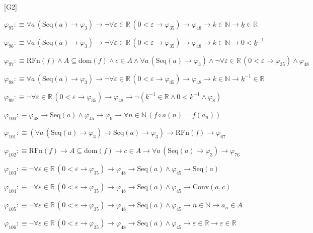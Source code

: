 \begin{fullproof}{[G2]}
\begin{abbrevlist}
\item $\varphi_{95} :\equiv \forall a\,(\mathrm{Seq}(a) \to \varphi_{3}) \to \neg \forall \varepsilon \in \mathbb{R}\,(0 < \varepsilon \to \varphi_{35}) \to \varphi_{48} \to k \in \mathbb{N} \to \underline{k} \in \mathbb{R}$
\item $\varphi_{96} :\equiv \forall a\,(\mathrm{Seq}(a) \to \varphi_{3}) \to \neg \forall \varepsilon \in \mathbb{R}\,(0 < \varepsilon \to \varphi_{35}) \to \varphi_{48} \to k \in \mathbb{N} \to 0 < \underline{k}^{-1}$
\item $\varphi_{97} :\equiv \mathrm{RFn}(f) \land A \subseteq \mathrm{dom}(f) \land c \in A \land \forall a\,(\mathrm{Seq}(a) \to \varphi_{3}) \land \neg \forall \varepsilon \in \mathbb{R}\,(0 < \varepsilon \to \varphi_{35}) \land \varphi_{48}$
\item $\varphi_{98} :\equiv \forall a\,(\mathrm{Seq}(a) \to \varphi_{3}) \to \neg \forall \varepsilon \in \mathbb{R}\,(0 < \varepsilon \to \varphi_{35}) \to \varphi_{48} \to k \in \mathbb{N} \to \underline{k}^{-1} \in \mathbb{R}$
\item $\varphi_{99} :\equiv \neg \forall \varepsilon \in \mathbb{R}\,(0 < \varepsilon \to \varphi_{35}) \to \varphi_{48} \to \neg (\underline{k}^{-1} \in \mathbb{R} \land 0 < \underline{k}^{-1} \land \varphi_{8})$
\item $\varphi_{100} :\equiv \varphi_{48} \to \mathrm{Seq}(a) \land \varphi_{45} \to \varphi_{9} \to \forall n \in \mathbb{N}\,(f \circ a(n) = f(a_{n}))$
\item $\varphi_{101} :\equiv (\forall a\,(\mathrm{Seq}(a) \to \varphi_{3}) \to \mathrm{Seq}(a) \to \varphi_{3}) \to \mathrm{RFn}(f) \to \varphi_{67}$
\item $\varphi_{102} :\equiv \mathrm{RFn}(f) \to A \subseteq \mathrm{dom}(f) \to c \in A \to \forall a\,(\mathrm{Seq}(a) \to \varphi_{3}) \to \varphi_{76}$
\item $\varphi_{103} :\equiv \neg \forall \varepsilon \in \mathbb{R}\,(0 < \varepsilon \to \varphi_{35}) \to \varphi_{48} \to \mathrm{Seq}(a) \land \varphi_{45} \to \mathrm{Seq}(a)$
\item $\varphi_{104} :\equiv \neg \forall \varepsilon \in \mathbb{R}\,(0 < \varepsilon \to \varphi_{35}) \to \varphi_{48} \to \mathrm{Seq}(a) \land \varphi_{45} \to \mathrm{Conv}(a,c)$
\item $\varphi_{105} :\equiv \neg \forall \varepsilon \in \mathbb{R}\,(0 < \varepsilon \to \varphi_{35}) \to \varphi_{48} \to \mathrm{Seq}(a) \land \varphi_{45} \to n \in \mathbb{N} \to a_{n} \in A$
\item $\varphi_{106} :\equiv \neg \forall \varepsilon \in \mathbb{R}\,(0 < \varepsilon \to \varphi_{35}) \to \varphi_{48} \to \mathrm{Seq}(a) \land \varphi_{45} \to \varepsilon \in \mathbb{R} \to \varepsilon \in \mathbb{R}$

\end{abbrevlist}
\end{fullproof}
